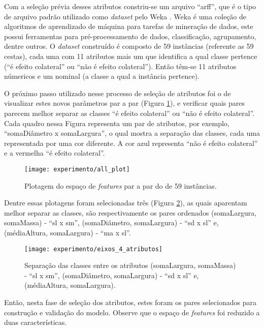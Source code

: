 Com a seleção prévia desses atributos constriu-se um arquivo ``arff'', que é o tipo de arquivo padrão utilizado como \textit{dataset} pelo Weka \cite{Hall:2009}. Weka é uma coleção de algoritmos de aprendizado de máquina para tarefas de mineração de dados, este possui ferramentas para pré-processamento de dados, classificação, agrupamento, dentre outros. O \textit{dataset} construído é composto de 59 instâncias (referente as 59 cestas), cada uma com 11 atributos mais um que identifica a qual classe pertence (``é efeito colateral'' ou ``não é efeito colateral''). Então têm-se 11 atributos númericos e um nominal (a classe a qual a instância pertence).

O próximo passo utilizado nesse processo de seleção de atributos foi o de visualizar estes novos parâmetros par a par (Figura \ref{fig:plotall1}), e verificar quais pares parecem melhor separar as classes ``é efeito colateral'' ou ``não é efeito colateral''. Cada quadro nessa Figura representa um par de atributos, por exemplo, ``somaDiâmetro x somaLargura'', o qual mostra a separação das classes, cada uma representada por uma cor diferente. A cor azul representa ``não é efeito colateral'' e a vermelha ``é efeito colateral''.

\begin{figure}[!htb] \centering 
  \centering
  \texttt{[image: experimento/all\_plot]} 
  \caption{Plotagem do espaço de \textit{features} par a par do  de 59 instâncias.} 
  \label{fig:plotall1}
\end{figure}
 
Dentre essas plotagens foram selecionadas três (Figura \ref{fig:eixos_4_atributos}), as quais aparentam melhor separar as classes, são respectivamente os pares ordenados (somaLargura, somaMassa) - ``sl x sm'', (somaDiâmetro, somaLargura) - ``sd x sl'' e, (médiaAltura, somaLargura) - ``ma x sl''.

\begin{figure}[!htb] \centering 
  \centering
  \texttt{[image: experimento/eixos\_4\_atributos]} 
  \caption{Separação das classes entre os atributos (somaLargura, somaMassa) - ``sl x sm'', (somaDiâmetro, somaLargura) - ``sd x sl'' e, (médiaAltura, somaLargura).} 
  \label{fig:eixos_4_atributos}
\end{figure}

Então, nesta fase de seleção dos atributos, estes foram os pares selecionados para construção e validação do modelo. Observe que o espaço de \textit{features} foi reduzido a duas características.

